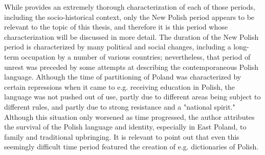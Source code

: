 While \citet{klemensiewicz_76} provides an extremely thorough characterization of each of those periods, including the socio-historical context, only the New Polish period appears to be relevant to the topic of this thesis, and therefore it is this period whose characterization will be discussed in more detail. The duration of the New Polish period is characterized by many political and social changes, including a long-term occupation by a number of various countries; nevertheless, that period of unrest was preceded by some attempts at describing the contemporaneous Polish language. Although the time of partitioning of Poland was characterized by certain repressions when it came to e.g. receiving education in Polish, the language was not pushed out of use, partly due to different areas being subject to different rules, and partly due to strong resistance and a "national spirit." Although this situation only worsened as time progressed, the author attributes the survival of the Polish language and identity, especially in East Poland, to family and traditional upbringing. It is relevant to point out that even this seemingly difficult time period featured the creation of e.g. dictionaries of Polish. 

